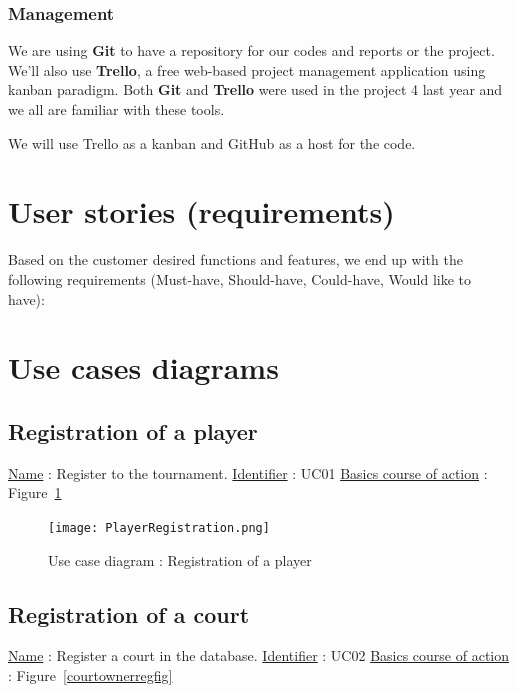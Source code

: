 \subsubsection{Management}

We are using \textbf{Git} to have a repository for our codes and reports or the project. We'll also use \textbf{Trello}, a free web-based project management application using kanban paradigm. Both \textbf{Git} and \textbf{Trello} were used in the project 4 last year and we all are familiar with these tools.

We will use Trello as a kanban and GitHub as a host for the code. \newline
\fi

\section{User stories (requirements)}
Based on the customer desired functions and features, we end up with the
following requirements (Must-have, Should-have, Could-have, Would like
to have):



\section{Use cases diagrams}
\subsection{Registration of a player}

\noindent \underline{Name} : Register to the tournament. \newline
\underline{Identifier} : UC01 \newline
\underline{Basics course of action} : Figure~\ref{playerregistrationfig} \newline

\begin{figure}[!ht]
    \centering
    \texttt{[image: PlayerRegistration.png]}
    \caption{Use case diagram : Registration of a player}
    \label{playerregistrationfig}
\end{figure}
\FloatBarrier

\subsection{Registration of a court}

\noindent \underline{Name} : Register a court in the database. \newline
\underline{Identifier} : UC02 \newline
\underline{Basics course of action} : Figure~\ref{courtownerregfig} \newline

